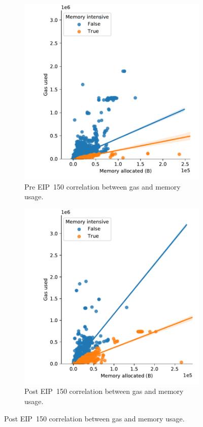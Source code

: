 \begin{figure}[t!]
\begin{subfigure}{.8\columnwidth}
  \centering\includegraphics[width=.8\columnwidth]{figures/memory-usage-1400000-1500000.pdf}
  \caption{Pre EIP~150 correlation between gas and memory usage.}
  \label{fig:gas-memory-pre-eip150}
\end{subfigure}

\begin{subfigure}{.8\columnwidth}
  \centering\includegraphics[width=.8\columnwidth]{figures/memory-usage-2500000-2600000.pdf}
  \caption{Post EIP~150 correlation between gas and memory usage.}
  \label{fig:gas-memory-post-eip150}
\end{subfigure}


\end{figure}
